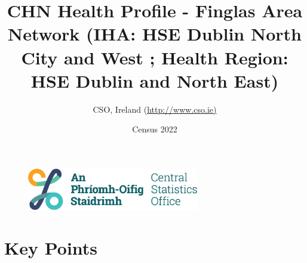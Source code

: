 \documentclass{article}
\title{CHN Health Profile - Finglas Area Network (IHA: HSE Dublin North City and West ;  Health Region: HSE Dublin and North East) }
\date{Census 2022}
\author{CSO, Ireland  (\url{http://www.cso.ie)}}
\begin{document}


\begin{figure}
	\centering
\includegraphics[width =75mm]{../figures/CSO_Logo.png}
\end{figure}

				 
		   
						  
														  
																																													
												 
			 
\maketitle
					
													   
				 
						 
																																																																											   
				 
				  
  \pagebreak
    	    \tableofcontents

\pagebreak


\section{Key Points}
\end{document}
